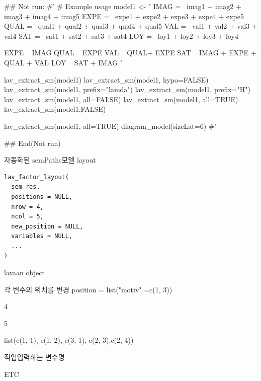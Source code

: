 \documentclass[a4paper]{book}
\begin{document}
%
\begin{Examples}
\begin{ExampleCode}

\#\# Not run: 
#'
# Example usage
model1 <- "
IMAG =~ imag1 + imag2 + imag3 + imag4 + imag5
EXPE =~ expe1 + expe2 + expe3 + expe4 + expe5
QUAL =~ qual1 + qual2 + qual3 + qual4 + qual5
VAL =~ val1 + val2 + val3 + val4
SAT =~ sat1 + sat2 + sat3 + sat4
LOY =~ loy1 + loy2 + loy3 + loy4

EXPE ~ IMAG
QUAL ~ EXPE
VAL ~  QUAL+ EXPE
SAT ~ IMAG + EXPE + QUAL + VAL
LOY ~ SAT + IMAG
"


lav_extract_sm(model1)%
lav_extract_sm(model1, hypo=FALSE)%
lav_extract_sm(model1, prefix="lamda")%
lav_extract_sm(model1, prefix="H")%
lav_extract_sm(model1, all=FALSE) %
lav_extract_sm(model1, all=TRUE) %
lav_extract_sm(model1,FALSE) %


lav_extract_sm(model1, all=TRUE) %
  diagram_model(sizeLat=6)
#'


## End(Not run)


\end{ExampleCode}
\end{Examples}
%
\begin{Description}
자동화된 semPaths모델 layout
\end{Description}
%
\begin{Usage}
\begin{verbatim}
lav_factor_layout(
  sem_res,
  positions = NULL,
  nrow = 4,
  ncol = 5,
  new_position = NULL,
  variables = NULL,
  ...
)
\end{verbatim}
\end{Usage}
%
\begin{Arguments}
\begin{ldescription}
\item[\code{sem\_res}] lavaan object

\item[\code{positions}] 각 변수의 위치를 변경 position = list("motiv" =c(1, 3))

\item[\code{nrow}] 4

\item[\code{ncol}] 5

\item[\code{new\_position}] list(c(1, 1), c(1, 2), c(3, 1), c(2, 3),c(2, 4))

\item[\code{variables}] 직업입력하는 변수명

\item[\code{...}] ETC
\end{ldescription}
\end{Arguments}
\end{document}
